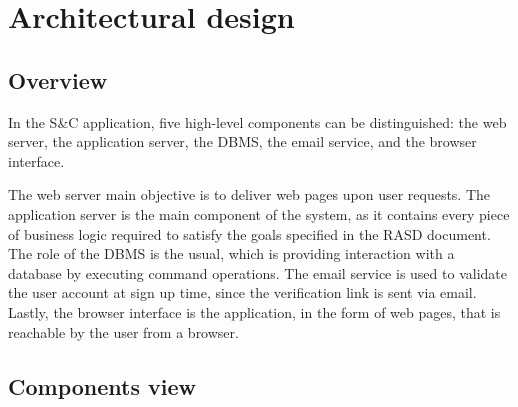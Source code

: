 \chapter{Architectural design}

\section{Overview}

In the S\&C application, five high-level components can be distinguished: the web server, the application server, the DBMS, the email service, and the browser interface.

The web server main objective is to deliver web pages upon user requests.
The application server is the main component of the system, as it contains every piece of business logic required to satisfy the goals specified in the RASD document.
The role of the DBMS is the usual, which is providing interaction with a database by executing command operations.
The email service is used to validate the user account at sign up time, since the verification link is sent via email.
Lastly, the browser interface is the application, in the form of web pages, that is reachable by the user from a browser.

\section{Components view}

